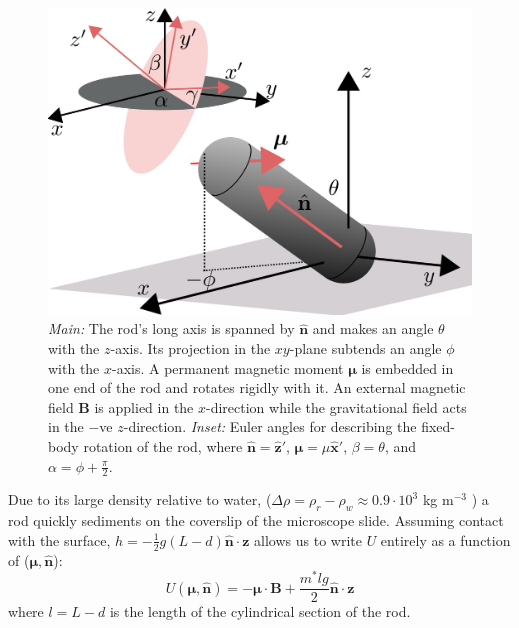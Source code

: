 \documentclass[aps,prl,reprint,twocolumn,superscriptaddress,showpacs]{revtex4-1}
\newcommand{\vcrm}[1]{\mathbf{#1}}
\newcommand{\hvcrm}[1]{\mathbf{\hat{#1}}}
\newcommand{\vc}[1]{\boldsymbol{#1}}
\begin{document}
\begin{figure}
		\includegraphics[width=0.95\columnwidth]{figs/geometry2.pdf}
	\caption{\footnotesize \emph{Main:} The rod's long axis is spanned by $\hvcrm{n}$ and makes an angle $\theta$ with the $z$-axis. Its projection in the $xy$-plane subtends an angle $\phi$ with the $x$-axis. A permanent magnetic moment $\vc{\mu}$ is embedded in one end of the rod and rotates rigidly with it. An external magnetic field $\vcrm{B}$ is applied in the $x$-direction while the gravitational field acts in the $-$ve $z$-direction. \emph{Inset:} Euler angles for describing the fixed-body rotation of the rod, where $\hvcrm{n}=\hvcrm{z}'$, $\vc{\mu}=\mu\hvcrm{x}'$, $\beta=\theta$, and $\alpha=\phi+\frac{\pi}{2}$.\label{fig:geometry}}
\end{figure}


Due to its large density relative to water, ($\Delta\rho = \rho_r - \rho_w \approx 0.9 \cdot 10^3$ kg m$^{-3}$ \cite{Kuijk2011}) a rod quickly sediments on the coverslip of the microscope slide. Assuming contact with the surface, $h=-\frac{1}{2}g(L-d)\hvcrm{n}\cdot\vc{z}$ allows us to write $U$ entirely as a function of ($\vc{\mu},\hvcrm{n}$):\begin{equation}\label{energy}
U(\vc{\mu},\hvcrm{n})= -\vc{\mu}\cdot\vcrm{B} + \frac{m^* l g}{2}  \hvcrm{n}\cdot\vc{z}
\end{equation}where $l=L-d$ is the length of the cylindrical section of the rod.
\end{document}
